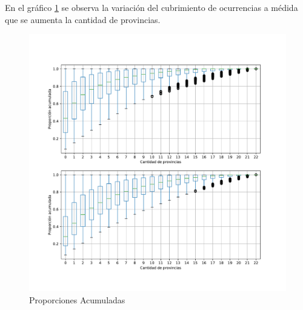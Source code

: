 En el gráfico \ref{fig:propAcum5000} se observa la variación del cubrimiento de ocurrencias a médida que se aumenta la cantidad de provincias. 


\begin{figure}[ht]
\centering
\includegraphics[scale=0.4]{./images/PropAcum5000.pdf}
\caption{Proporciones Acumuladas} 
\label{fig:propAcum5000} 
\end{figure}



